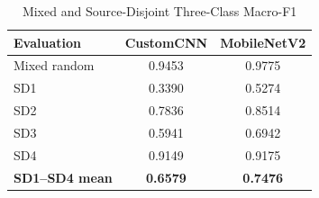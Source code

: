 
\begin{table}[t]
\centering
\caption{Mixed and Source-Disjoint Three-Class Macro-F1}
\label{tab:mixed_source}
\begin{tabular}{lcc}
\hline
Evaluation & CustomCNN & MobileNetV2 \\
\hline
Mixed random & 0.9453 & 0.9775 \\
SD1 & 0.3390 & 0.5274 \\
SD2 & 0.7836 & 0.8514 \\
SD3 & 0.5941 & 0.6942 \\
SD4 & 0.9149 & 0.9175 \\
\textbf{SD1--SD4 mean} & \textbf{0.6579} & \textbf{0.7476} \\
\hline
\end{tabular}
\end{table}

